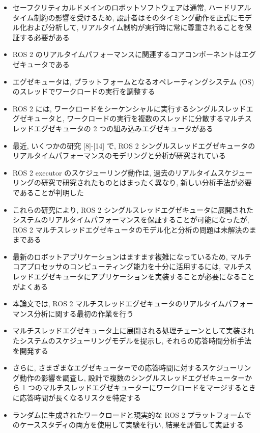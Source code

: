 \begin{frame}{}
    \begin{itemize}
        \item セーフクリティカルドメインのロボットソフトウェアは通常, ハードリアルタイム制約の影響を受けるため, 設計者はそのタイミング動作を正式にモデル化および分析して, リアルタイム制約が実行時に常に尊重されることを保証する必要がある
        \item ROS 2 のリアルタイムパフォーマンスに関連するコアコンポーネントはエグゼキュータである
        \item エグゼキュータは, プラットフォームとなるオペレーティングシステム (OS) のスレッドでワークロードの実行を調整する
        \item ROS 2 には, ワークロードをシーケンシャルに実行するシングルスレッドエグゼキュータと, ワークロードの実行を複数のスレッドに分散するマルチスレッドエグゼキュータの 2 つの組み込みエグゼキュータがある
        \item 最近, いくつかの研究 [8]-[14] で, ROS 2 シングルスレッドエグゼキュータのリアルタイムパフォーマンスのモデリングと分析が研究されている
        \item ROS 2 executor のスケジューリング動作は, 過去のリアルタイムスケジューリングの研究で研究されたものとはまったく異なり, 新しい分析手法が必要であることが判明した
        \item これらの研究により, ROS 2 シングルスレッドエグゼキュータに展開されたシステムのリアルタイムパフォーマンスを保証することが可能になったが, ROS 2 マルチスレッドエグゼキュータのモデル化と分析の問題は未解決のままである
    \end{itemize}
\end{frame}

\begin{frame}{}
    \begin{itemize}
        \item 最新のロボットアプリケーションはますます複雑になっているため, マルチコアプロセッサのコンピューティング能力を十分に活用するには, マルチスレッドエグゼキュータにアプリケーションを実装することが必要になることがよくある
        \item 本論文では, ROS 2 マルチスレッドエグゼキュータのリアルタイムパフォーマンス分析に関する最初の作業を行う
        \item マルチスレッドエグゼキュータ上に展開される処理チェーンとして実装されたシステムのスケジューリングモデルを提示し, それらの応答時間分析手法を開発する
        \item さらに, さまざまなエグゼキューターでの応答時間に対するスケジューリング動作の影響を調査し, 設計で複数のシングルスレッドエグゼキューターから 1 つのマルチスレッドエグゼキューターにワークロードをマージするときに応答時間が長くなるリスクを特定する
        \item ランダムに生成されたワークロードと現実的な ROS 2 プラットフォームでのケーススタディの両方を使用して実験を行い, 結果を評価して実証する
    \end{itemize}
\end{frame}
